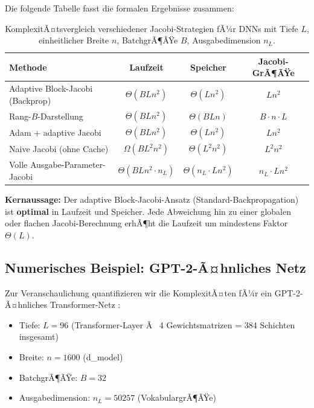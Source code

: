 ﻿\documentclass[a4paper,12pt]{article}
\theoremstyle{definition}
\begin{document}
Die folgende Tabelle fasst die formalen Ergebnisse zusammen:

\begin{table}[h!]
	\centering
	\renewcommand{\arraystretch}{1.4}
	\begin{tabular}{|l|c|c|c|}
		\toprule
		\textbf{Methode} & \textbf{Laufzeit} & \textbf{Speicher} & \textbf{Jacobi-GrÃ¶ÃŸe} \\
		\midrule
		Adaptive Block-Jacobi (Backprop) & $\Theta(BLn^2)$ & $\Theta(Ln^2)$ & $Ln^2$ \\
		Rang-$B$-Darstellung & $\Theta(BLn^2)$ & $\Theta(BLn)$ & $B \cdot n \cdot L$ \\
		Adam + adaptive Jacobi & $\Theta(BLn^2)$ & $\Theta(Ln^2)$ & $Ln^2$ \\
		Naive Jacobi (ohne Cache) & $\Omega(BL^2n^2)$ & $\Theta(L^2n^2)$ & $L^2n^2$ \\
		Volle Ausgabe-Parameter-Jacobi & $\Theta(BLn^2 \cdot n_L)$ & $\Theta(n_L \cdot Ln^2)$ & $n_L \cdot Ln^2$ \\
		\bottomrule
	\end{tabular}
	\caption{KomplexitÃ¤tsvergleich verschiedener Jacobi-Strategien fÃ¼r DNNs mit Tiefe $L$, einheitlicher Breite $n$, BatchgrÃ¶ÃŸe $B$, Ausgabedimension $n_L$.}
	\label{tab:complexity}
\end{table}

\textbf{Kernaussage:} Der adaptive Block-Jacobi-Ansatz (Standard-Backpropagation) ist \textbf{optimal} in Laufzeit und Speicher. Jede Abweichung hin zu einer globalen oder flachen Jacobi-Berechnung erhÃ¶ht die Laufzeit um mindestens Faktor $\Theta(L)$.

\subsection{Numerisches Beispiel: GPT-2-Ã¤hnliches Netz}

Zur Veranschaulichung quantifizieren wir die KomplexitÃ¤ten fÃ¼r ein GPT-2-Ã¤hnliches Transformer-Netz \cite{LeCun2015}:

\begin{itemize}
	\item Tiefe: $L = 96$ (Transformer-Layer Ã  4 Gewichtsmatrizen = 384 Schichten insgesamt)
	\item Breite: $n = 1600$ (d\_model)
	\item BatchgrÃ¶ÃŸe: $B = 32$
	\item Ausgabedimension: $n_L = 50257$ (VokabulargrÃ¶ÃŸe)
\end{itemize}
\end{document}
